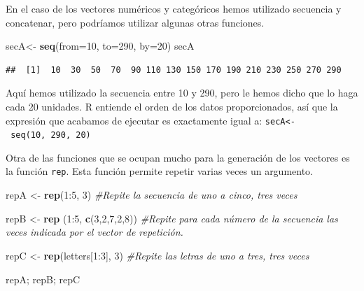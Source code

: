 \documentclass[]{article}
\newenvironment{Shaded}{\begin{snugshade}}{\end{snugshade}}
\newcommand{\KeywordTok}[1]{\textcolor[rgb]{0.13,0.29,0.53}{\textbf{{#1}}}}
\newcommand{\DataTypeTok}[1]{\textcolor[rgb]{0.13,0.29,0.53}{{#1}}}
\newcommand{\DecValTok}[1]{\textcolor[rgb]{0.00,0.00,0.81}{{#1}}}
\newcommand{\StringTok}[1]{\textcolor[rgb]{0.31,0.60,0.02}{{#1}}}
\newcommand{\CommentTok}[1]{\textcolor[rgb]{0.56,0.35,0.01}{\textit{{#1}}}}
\newcommand{\NormalTok}[1]{{#1}}
\begin{document}
En el caso de los vectores numéricos y categóricos hemos utilizado
secuencia y concatenar, pero podríamos utilizar algunas otras funciones.

\begin{Shaded}
\begin{Highlighting}[]
\NormalTok{secA<-}\StringTok{ }\KeywordTok{seq}\NormalTok{(}\DataTypeTok{from=}\DecValTok{10}\NormalTok{, }\DataTypeTok{to=}\DecValTok{290}\NormalTok{, }\DataTypeTok{by=}\DecValTok{20}\NormalTok{)}
\NormalTok{secA}
\end{Highlighting}
\end{Shaded}

\begin{verbatim}
##  [1]  10  30  50  70  90 110 130 150 170 190 210 230 250 270 290
\end{verbatim}

Aquí hemos utilizado la secuencia entre 10 y 290, pero le hemos dicho
que lo haga cada 20 unidades. R entiende el orden de los datos
proporcionados, así que la expresión que acabamos de ejecutar es
exactamente igual a: \texttt{secA\textless{}-\ seq(10,\ 290,\ 20)}

Otra de las funciones que se ocupan mucho para la generación de los
vectores es la función \texttt{rep}. Esta función permite repetir varias
veces un argumento.

\begin{Shaded}
\begin{Highlighting}[]
\NormalTok{repA <-}\StringTok{ }\KeywordTok{rep}\NormalTok{(}\DecValTok{1}\NormalTok{:}\DecValTok{5}\NormalTok{, }\DecValTok{3}\NormalTok{) }\CommentTok{#Repite la secuencia de uno a cinco, tres veces }

\NormalTok{repB <-}\StringTok{ }\KeywordTok{rep} \NormalTok{(}\DecValTok{1}\NormalTok{:}\DecValTok{5}\NormalTok{, }\KeywordTok{c}\NormalTok{(}\DecValTok{3}\NormalTok{,}\DecValTok{2}\NormalTok{,}\DecValTok{7}\NormalTok{,}\DecValTok{2}\NormalTok{,}\DecValTok{8}\NormalTok{)) }\CommentTok{#Repite para cada número de la secuencia las veces indicada por el vector de repetición.}

\NormalTok{repC <-}\StringTok{ }\KeywordTok{rep}\NormalTok{(letters[}\DecValTok{1}\NormalTok{:}\DecValTok{3}\NormalTok{], }\DecValTok{3}\NormalTok{) }\CommentTok{#Repite las letras de uno a tres, tres veces}

\NormalTok{repA; repB; repC}
\end{Highlighting}
\end{Shaded}
\end{document}
